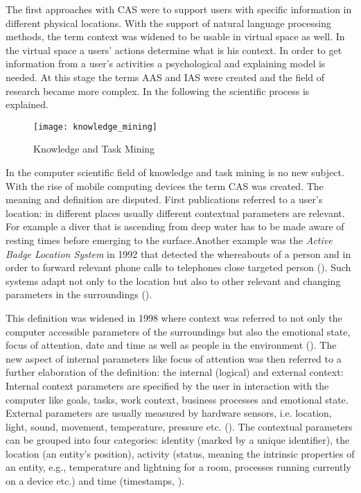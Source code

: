 The first approaches with \ac{CAS} were to support users with specific information in different physical locations. With the support of natural language processing methods, the term context was widened to be usable in virtual space as well. In the virtual space a users' actions determine what is his context. In order to get information from a user's activities a psychological and explaining model is needed. At this stage the terms \ac{AAS} and \ac{IAS} were created and the field of research became more complex. In the following the scientific process is explained.


\begin{figure}[ht]
	\centering
  \texttt{[image: knowledge\_mining]}
	\caption{Knowledge and Task Mining}
	\label{fig2}
\end{figure}


In the computer scientific field of knowledge and task mining is no new subject. With the rise of mobile computing devices the term \ac{CAS} was created. The meaning and definition are disputed. First publications referred to a user's location: in different places usually different contextual parameters are relevant. For example a diver that is ascending from deep water has to be made aware of resting times before emerging to the surface.Another example was the \textit{Active Badge Location System} in 1992 that detected the whereabouts of a person and in order to forward relevant phone calls to telephones close targeted person (\cite{want1992active}). Such systems adapt not only to the location but also to other relevant and changing parameters in the surroundings (\cite{schilit1994context}). 

This definition was widened in 1998 where context was referred to not only the computer accessible parameters of the surroundings but also the emotional state, focus of attention, date and time as well as people in the environment (\cite{dey1998context}). The new aspect of internal parameters like focus of attention was then referred to a further elaboration of the definition: the internal (logical) and external context: Internal context parameters are specified by the user in interaction with the computer like goals, tasks, work context, business processes and emotional state. External parameters are usually measured by hardware sensors, i.e. location, light, sound, movement, temperature, pressure etc. (\cite{hofer2003context}). The contextual parameters can be grouped into four categories: identity (marked by a unique identifier), the location (an entity’s position), activity (status, meaning the intrinsic properties of an entity, e.g., temperature and lightning for a room, processes running currently on a device etc.) and time (timestamps, \cite{dey2001conceptual}). 

